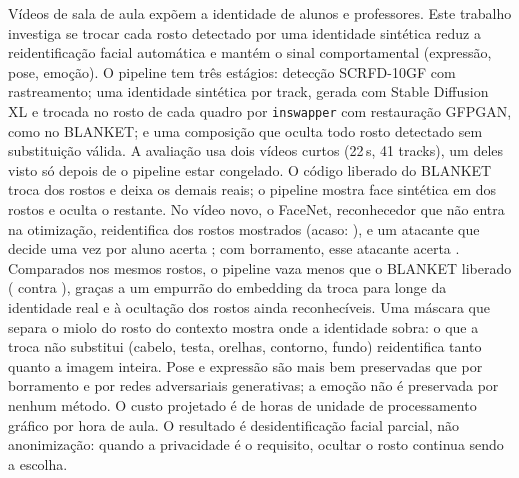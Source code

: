 \begin{resumo}

Vídeos de sala de aula expõem a identidade de alunos e professores. Este
trabalho investiga se trocar cada rosto detectado por uma identidade sintética
reduz a reidentificação facial automática e mantém o sinal comportamental
(expressão, pose, emoção). O pipeline tem três estágios: detecção SCRFD-10GF com
rastreamento; uma identidade sintética por track, gerada com Stable Diffusion XL
e trocada no rosto de cada quadro por \texttt{inswapper} com restauração GFPGAN,
como no BLANKET; e uma composição que oculta todo rosto detectado sem
substituição válida. A avaliação usa dois vídeos curtos (22\,s, 41 tracks), um
deles visto só depois de o pipeline estar congelado. O código liberado do
BLANKET troca  dos rostos e deixa os
demais reais; o pipeline mostra face sintética em
 dos rostos e oculta o restante. No
vídeo novo, o FaceNet, reconhecedor que não entra na otimização, reidentifica
 dos rostos mostrados
(acaso: ), e um atacante que decide uma vez
por aluno acerta ; com
borramento, esse atacante acerta .
Comparados nos mesmos rostos, o pipeline vaza menos que o BLANKET liberado
( contra
), graças a um
empurrão do embedding da troca para longe da identidade real e à ocultação dos
rostos ainda reconhecíveis. Uma máscara que separa o miolo do rosto do contexto
mostra onde a identidade sobra: o que a troca não substitui (cabelo, testa,
orelhas, contorno, fundo) reidentifica tanto quanto a imagem inteira. Pose e
expressão são mais bem preservadas que por borramento e por redes adversariais
generativas; a emoção não é preservada por nenhum método. O custo projetado é de
 horas de unidade de processamento
gráfico por hora de aula. O resultado é desidentificação facial parcial, não
anonimização: quando a privacidade é o requisito, ocultar o rosto continua
sendo a escolha.

\end{resumo}
